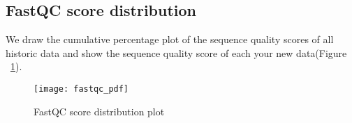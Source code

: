 \documentclass[11pt,a4paper]{article}
\begin{document}
\subsection{FastQC score distribution}
We draw the cumulative percentage plot of the sequence quality scores of all historic data and show the sequence quality score of each your new data(Figure ~\ref{fastqcplot}). \newline
\begin{figure}[h]
\setlength{\abovecaptionskip}{0pt} 
\setlength{\belowcaptionskip}{10pt}
\caption{FastQC score distribution plot} \label{fastqcplot}
\centering
{\texttt{[image: fastqc\_pdf]}}
\end{figure}
\newpage	
\end{document}

